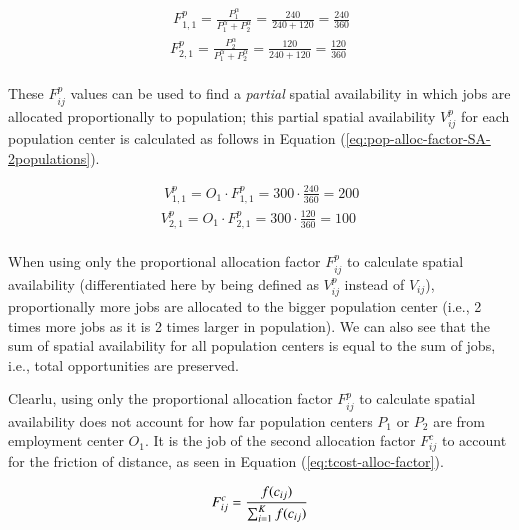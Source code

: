 \documentclass[]{elsarticle} %
\begin{document}
\begin{equation}
\label{eq:pop-alloc-factor-2populations}
\begin{array}{l}\
F^p_{1,1} = \frac{P_1 ^\alpha}{P_1^\alpha + P_2^\alpha} = \frac{240}{240 + 120} = \frac{240}{360}\\
F^p_{2,1} = \frac{P_2^\alpha}{P_1^\alpha + P_2^\alpha}  = \frac{120}{240 + 120} = \frac{120}{360}\\
\end{array}
\end{equation}

These \(F^p_{ij}\) values can be used to find a \emph{partial} spatial
availability in which jobs are allocated proportionally to population;
this partial spatial availability \(V^p_{ij}\) for each population
center is calculated as follows in Equation
(\ref{eq:pop-alloc-factor-SA-2populations}).

\begin{equation}
\label{eq:pop-alloc-factor-SA-2populations}
\begin{array}{l}\
V^p_{1,1} = O_1 \cdot F^p_{1,1} = 300 \cdot \frac{240}{360} = 200 \\
V^p_{2,1} = O_1 \cdot F^p_{2,1} = 300 \cdot \frac{120}{360} = 100 \\
\end{array}
\end{equation}

When using only the proportional allocation factor \(F^p_{ij}\) to
calculate spatial availability (differentiated here by being defined as
\(V^p_{ij}\) instead of \(V_{ij}\)), proportionally more jobs are
allocated to the bigger population center (i.e., 2 times more jobs as it
is 2 times larger in population). We can also see that the sum of
spatial availability for all population centers is equal to the sum of
jobs, i.e., total opportunities are preserved.

Clearlu, using only the proportional allocation factor \(F^p_{ij}\) to
calculate spatial availability does not account for how far population
centers \(P_1\) or \(P_2\) are from employment center \(O_1\). It is the
job of the second allocation factor \(F^c_{ij}\) to account for the
friction of distance, as seen in Equation (\ref{eq:tcost-alloc-factor}).

\begin{equation}
\label{eq:tcost-alloc-factor}
F^c_{ij} = \frac{f(c_{ij})}{\sum_{i=1}^K f(c_{ij})}\\
\end{equation}
\end{document}
